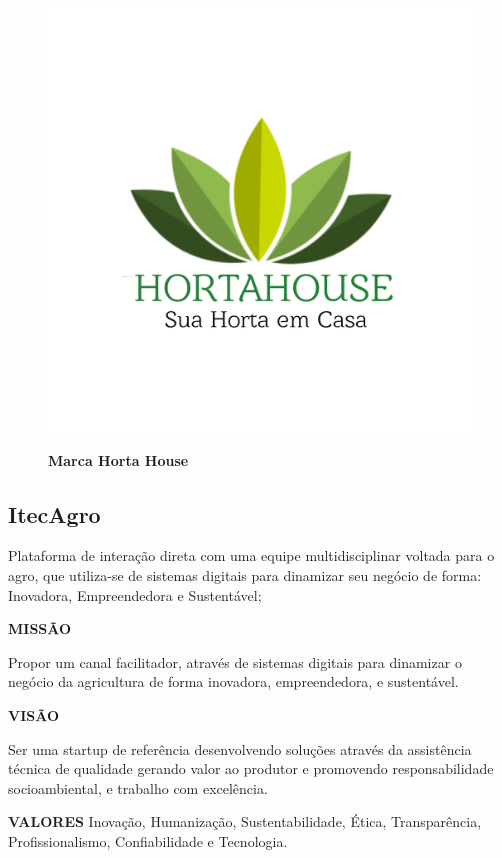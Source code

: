 \begin{figure}[!htb]
\centering
\caption{\textbf{Marca Horta House}}
\includegraphics[scale=0.1]{Imagens/hortahouse.png}
\label{figura_21}
\end{figure}
\newpage


\subsection{ItecAgro}

Plataforma de interação direta com uma equipe multidisciplinar voltada
para o agro, que utiliza-se de sistemas digitais para dinamizar seu
negócio de forma: Inovadora, Empreendedora e Sustentável;

\textbf{MISSÃO}

Propor um canal facilitador, através de sistemas digitais para dinamizar o negócio da agricultura de forma inovadora, empreendedora, e sustentável.

\textbf{VISÃO}

Ser uma startup de referência desenvolvendo soluções através da assistência técnica de qualidade gerando valor ao produtor e promovendo responsabilidade socioambiental, e trabalho com excelência.

\textbf{VALORES}
Inovação, Humanização, Sustentabilidade, Ética, Transparência, Profissionalismo, Confiabilidade e Tecnologia.

